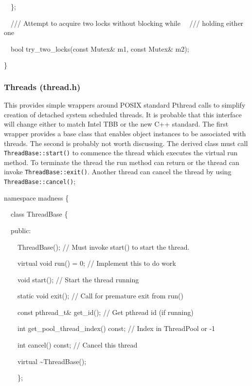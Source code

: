 \documentclass[letterpaper]{article}
\begin{document}
{\ttfamily
\ \ \};}


\bigskip

{\ttfamily
\ \ /// Attempt to acquire two locks without blocking while \newline
\ \ /// holding either one}

{\ttfamily
\ \ bool try\_two\_locks(const Mutex\& m1, const Mutex\& m2);}

{\ttfamily
\}}


\bigskip

\subsubsection{Threads (thread.h)}
This provides simple wrappers around POSIX standard Pthread calls to simplify creation of detached system scheduled
threads. It is probable that this interface will change either to match Intel TBB or the new C++ standard. The first
wrapper provides a base class that enables object instances to be associated with threads. The second is probably not
worth discussing. The derived class must call \texttt{ThreadBase::start()} to commence the thread which executes the
virtual run method. To terminate the thread the run method can return or the thread can invoke
\texttt{ThreadBase::exit()}. Another thread can cancel the thread by using \texttt{ThreadBase::cancel()};

{\ttfamily
namespace madness \{}

{\ttfamily
\ \ class ThreadBase \{}

{\ttfamily
\ \ public:}

{\ttfamily
\ \ \ \ ThreadBase(); // Must invoke start() to start the thread.}

{\ttfamily
\ \ \ \ virtual void run() = 0; // Implement this to do work}

{\ttfamily
\ \ \ \ void start(); // Start the thread running}

{\ttfamily
\ \ \ \ static void exit(); // Call for premature exit from run()}

{\ttfamily
\ \ \ \ const pthread\_t\& get\_id(); // Get pthread id (if running)}

{\ttfamily
\ \ \ \ int get\_pool\_thread\_index() const; // Index in ThreadPool or -1}

{\ttfamily
\ \ \ \ int cancel() const; // Cancel this thread}

{\ttfamily
\ \ \ \ virtual \~{}ThreadBase();}

{\ttfamily
\ \ \ \ \};}
\end{document}
